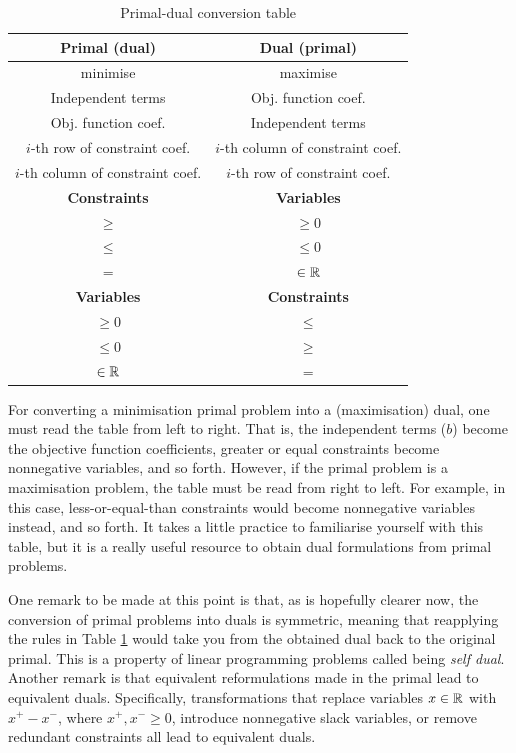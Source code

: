 \begin{table}[h]
	\begin{tabular}{|c|c|} \hline
		{\bf Primal (dual)} & {\bf Dual (primal)} \\ \hline
		 minimise & maximise \\
		Independent terms  & Obj. function coef.  \\
		Obj. function coef.  & Independent terms  \\
		$i$-th row of constraint coef. & $i$-th column of constraint coef. \\
		$i$-th column of constraint coef. & $i$-th row of constraint coef. \\ \hline
		{\bf Constraints} & {\bf Variables} \\ \hline
		$\geq$ & $\geq 0$ \\
		$\leq$ & $\leq 0$ \\
		$=$ & $\in \mathbb{R}$ \\ \hline
		{\bf Variables} & {\bf Constraints} \\ \hline
		$\geq 0$ & $\leq$ \\
		$\leq 0$ & $\geq$ \\
		$\in \mathbb{R}$ & $=$ \\ \hline
	\end{tabular}
	\caption{Primal-dual conversion table} \label{p1c5:tab:primal-dual_conversion}
\end{table}

For converting a minimisation primal problem into a (maximisation) dual, one must read the table from left to right. That is, the independent terms ($b$) become the objective function coefficients, greater or equal constraints become nonnegative variables, and so forth. However, if the primal problem is a maximisation problem, the table must be read from right to left. For example, in this case, less-or-equal-than constraints would become nonnegative variables instead, and so forth. It takes a little practice to familiarise yourself with this table, but it is a really useful resource to obtain dual formulations from primal problems.

One remark to be made at this point is that, as is hopefully clearer now, the conversion of primal problems into duals is symmetric, meaning that reapplying the rules in Table \ref{p1c5:tab:primal-dual_conversion} would take you from the obtained dual back to the original primal. This is a property of linear programming problems called being \emph{self dual}. Another remark is that equivalent reformulations made in the primal lead to equivalent duals. Specifically, transformations that replace variables $x \in \mathbb{R}$ with $x^+ - x^-$, where $x^+, x^- \geq 0$, introduce nonnegative slack variables, or remove redundant constraints all lead to equivalent duals. 

